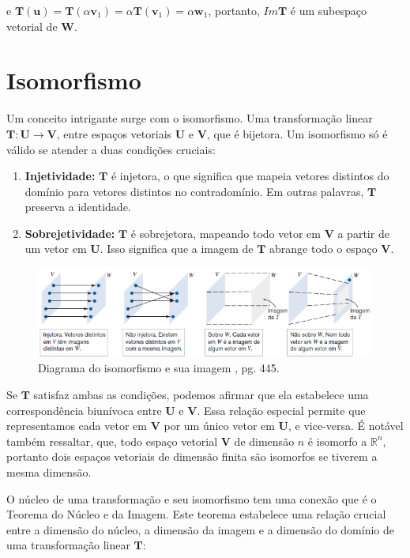 \noindent e $\mathbf{T}(\mathbf{u}) = \mathbf{T}(\alpha\mathbf{v}_1) = \alpha\mathbf{T}(\mathbf{v}_1) = \alpha\mathbf{w}_1$, portanto, $Im\mathbf{T}$ é um subespaço vetorial de $\mathbf{W}$.

\section{Isomorfismo}
Um conceito intrigante surge com o isomorfismo. Uma transformação linear $\mathbf{T}: \mathbf{U} \longrightarrow \mathbf{V}$, entre espaços vetoriais $\mathbf{U}$ e $\mathbf{V}$, que é bijetora. Um isomorfismo só é válido se atender a duas condições cruciais:

\begin{enumerate}
	\item \textbf{Injetividade:} $\mathbf{T}$ é injetora, o que significa que mapeia vetores distintos do domínio para vetores distintos no contradomínio. Em outras palavras, $\mathbf{T}$ preserva a identidade.
	\item \textbf{Sobrejetividade:} $\mathbf{T}$ é sobrejetora, mapeando todo vetor em $\mathbf{V}$ a partir de um vetor em $\mathbf{U}$. Isso significa que a imagem de $\mathbf{T}$ abrange todo o espaço $\mathbf{V}$.
\end{enumerate}

\begin{figure}[H]
	\centering
	\includegraphics[scale=0.90]{t_isomorfismo.png}
	\caption{Diagrama do isomorfismo e sua imagem \cite{anton2010elementary}, pg. 445.}
\end{figure}

Se $\mathbf{T}$ satisfaz ambas as condições, podemos afirmar que ela estabelece uma correspondência biunívoca entre $\mathbf{U}$ e $\mathbf{V}$. Essa relação especial permite que representamos cada vetor em $\mathbf{V}$  por um único vetor em $\mathbf{U}$, e vice-versa. É notável também ressaltar, que, todo espaço vetorial $\mathbf{V}$ de dimensão $n$ é isomorfo a $\mathbb{R}^n$, portanto dois espaços vetoriais de dimensão finita são isomorfos se tiverem a mesma dimensão.

O núcleo de uma transformação e seu isomorfismo tem uma conexão que é o Teorema do Núcleo e da Imagem. Este teorema estabelece uma relação crucial entre a dimensão do núcleo, a dimensão da imagem e a dimensão do domínio de uma transformação linear $\mathbf{T}$:

